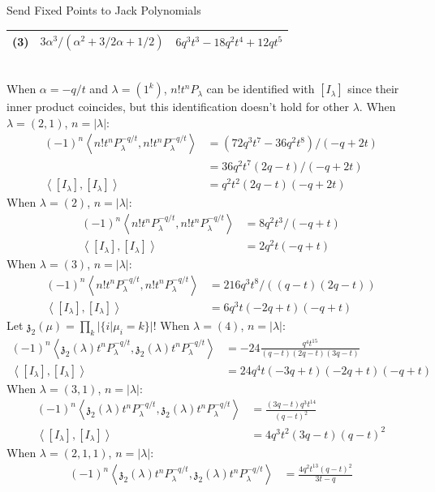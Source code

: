 \documentclass{article}
\renewcommand{\frak}[1]{\mathfrak{#1}}
\newcommand{\inprod}[1]{\left<{#1}\right>}
\begin{document}
\begin{subsection}{Send Fixed Points to Jack Polynomials}
\begin{tabular}{|c|c|c|}
  (3) & $3\alpha^3/(\alpha^2 + 3/2\alpha + 1/2)$ & $6q^3t^3 - 18q^2t^4 + 12qt^5$ \\
  \hline
\end{tabular}\\
When $\alpha = -q/t$ and $\lambda = (1^k)$, $n!t^nP_{\lambda}$ can be identified with $[I_\lambda]$ since their inner product coincides, but this identification doesn't hold for other $\lambda$. When $\lambda = (2,1)$, $n = |\lambda|$:
\[
\begin{aligned}
(-1)^n\inprod{n!t^nP_{\lambda}^{-q/t},n!t^nP_{\lambda}^{-q/t}} &= (72q^3t^7 - 36q^2t^8)/(-q + 2t) \\
&= 36q^2t^7(2q-t)/(-q+2t)\\
\inprod{[I_\lambda],[I_\lambda]} &= q^2t^2(2q-t)(-q+2t)
\end{aligned}
\]
When $\lambda = (2)$, $n = |\lambda|$:
\[
\begin{aligned}
(-1)^n\inprod{n!t^nP_{\lambda}^{-q/t},n!t^nP_{\lambda}^{-q/t}} &= 8q^2t^3/(-q + t) \\
\inprod{[I_\lambda],[I_\lambda]} &= 2q^2t(-q + t)
\end{aligned}
\]
When $\lambda = (3)$, $n = |\lambda|$:
\[
\begin{aligned}
(-1)^n\inprod{n!t^nP_{\lambda}^{-q/t},n!t^nP_{\lambda}^{-q/t}} &= 216q^3t^8/((q - t) (2q - t))\\
\inprod{[I_\lambda],[I_\lambda]} &= 6q^3t(-2q + t)(-q + t)
\end{aligned}
\]
Let $\frak{z}_2(\mu) = \prod_k|\{i|\mu_i=k\}|!$
When $\lambda = (4)$, $n = |\lambda|$:
\[
\begin{aligned}
(-1)^{n}\inprod{\frak{z}_2(\lambda) t^nP_{\lambda}^{-q/t},\frak{z}_2(\lambda) t^nP_{\lambda}^{-q/t}} &= -24\frac{q^4t^{15}}{(q - t)  (2q - t) (3q - t)}\\
\inprod{[I_\lambda],[I_\lambda]} &= 24q^4t(-3q + t)(-2q + t)(-q + t)
\end{aligned}
\]
When $\lambda = (3,1)$, $n = |\lambda|$:
\[
\begin{aligned}
(-1)^n\inprod{\frak{z}_2(\lambda)t^nP_{\lambda}^{-q/t},\frak{z}_2(\lambda)t^nP_{\lambda}^{-q/t}} &= \frac{(3q - t) q^3 t^{14}}{(q - t)^2}\\
\inprod{[I_\lambda],[I_\lambda]} &= 4q^3t^2 (3q - t) (q - t)^2 
\end{aligned}
\]
When $\lambda = (2,1,1)$, $n = |\lambda|$:
\[
\begin{aligned}
(-1)^n\inprod{\frak{z}_2(\lambda)t^nP_{\lambda}^{-q/t},\frak{z}_2(\lambda)t^nP_{\lambda}^{-q/t}} &= \frac{4 q^2t^{13}(q - t)^2}{3t-q}\\

\end{aligned}\]
\end{subsection}
\end{document}
